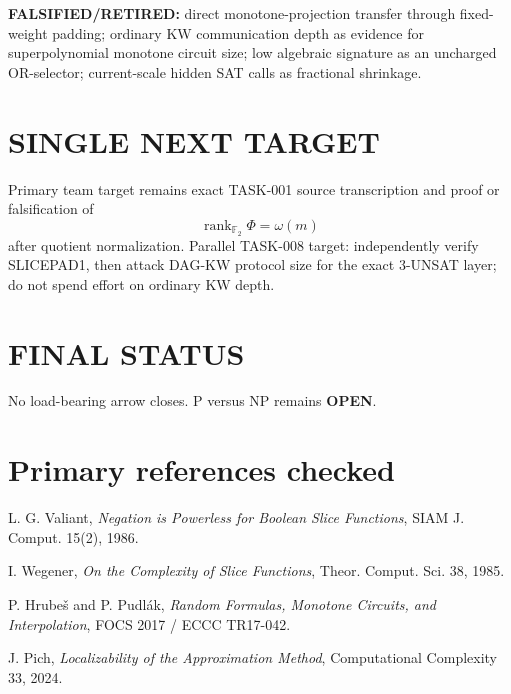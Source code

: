 \documentclass[11pt]{article}
\begin{document}
\textbf{FALSIFIED/RETIRED:} direct monotone-projection transfer through fixed-weight padding; ordinary KW communication depth as evidence for superpolynomial monotone circuit size; low algebraic signature as an uncharged OR-selector; current-scale hidden SAT calls as fractional shrinkage.

\section*{SINGLE NEXT TARGET}
Primary team target remains exact TASK-001 source transcription and proof or falsification of
\[
\boxed{\operatorname{rank}_{\mathbb F_2}\Phi=\omega(m)}
\]
after quotient normalization. Parallel TASK-008 target: independently verify SLICEPAD1, then attack DAG-KW protocol size for the exact $3$-UNSAT layer; do not spend effort on ordinary KW depth.

\section*{FINAL STATUS}
No load-bearing arrow closes. P versus NP remains \textbf{OPEN}.

\section*{Primary references checked}
L. G. Valiant, \emph{Negation is Powerless for Boolean Slice Functions}, SIAM J. Comput. 15(2), 1986.

I. Wegener, \emph{On the Complexity of Slice Functions}, Theor. Comput. Sci. 38, 1985.

P. Hrube\v{s} and P. Pudl\'ak, \emph{Random Formulas, Monotone Circuits, and Interpolation}, FOCS 2017 / ECCC TR17-042.

J. Pich, \emph{Localizability of the Approximation Method}, Computational Complexity 33, 2024.

\end{document}
